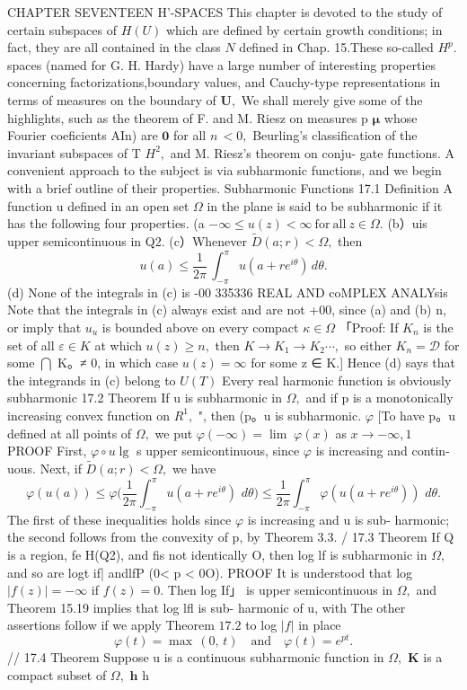 CHAPTER SEVENTEEN H'-SPACES This chapter is devoted to the study of certain subspaces of $H(U)$ which are defined by certain growth conditions; in fact, they are all contained in the class ${\mathbf{}}N$ defined in Chap. 15.These so-called $H^{p}.$ spaces (named for G. H. Hardy) have a large number of interesting properties concerning factorizations,boundary values, and Cauchy-type representations in terms of measures on the boundary of ${\boldsymbol{U}},$ We shall merely give some of the highlights, such as the theorem of F. and M. Riesz on measures p ${\boldsymbol{\mu}}$ whose Fourier coeficients AIn) are $\mathbf{0}$ for all $\scriptstyle n\,<0,$ Beurling's classification of the invariant subspaces of T $H^{2},$ and M. Riesz's theorem on conju- gate functions. A convenient approach to the subject is via subharmonic functions, and we begin with a brief outline of their properties. Subharmonic Functions 17.1 Definition A function u defined in an open set $\Omega$ in the plane is said to be subharmonic if it has the following four properties. (a $-\infty\leq u(z)<\infty{\mathrm{~for~all~}}z\in\Omega.$ (b）uis upper semicontinuous in Q2. (c）Whenever ${\tilde{D}}(a;r)<\Omega,$ then $$ u(a)\leq{\frac{1}{2\pi}}\,\int_{-\pi}^{\pi}u(a+r e^{i\theta})\,d\theta. $$ (d) None of the integrals in (c) is -00 335336 REAL AND coMPLEX ANALYsis Note that the integrals in (c) always exist and are not +00, since (a) and (b) n, or imply that $u_{u}$ is bounded above on every compact $\kappa\in\Omega$ 「Proof: If $K_{n}$ is the set of all $\scriptstyle{\varepsilon\in K}$ at which $u(z)\geq n,$ then $K\to K_{1}\to K_{2}\cdots,$ so either $K_{n}={\mathcal{D}}$ for some $\bigcap{}$ K。≠ 0, in which case $u(z)=\infty$ for some z ∈ K.] Hence (d) says that the integrands in (c) belong to $\scriptstyle U(T)$ Every real harmonic function is obviously subharmonic 17.2 Theorem If u is subharmonic in $\Omega,$ and if p is a monotonically increasing convex function on $R^{1},$ ", then (p。u is subharmonic. $\varphi$ [To have p。u defined at all points of $\Omega,$ we put $\varphi(-\infty)=\operatorname*{lim}\;\varphi(x)$ as $x\to-\infty,1$ PROOF First, $\varphi\circ u\lg$ s upper semicontinuous, since $\varphi$ is increasing and contin- uous. Next, if ${\tilde{D}}(a;r)<\Omega,$ we have $$ \varphi(u(a))\leq\varphi{\Biggl(}{\frac{1}{2\pi}}\int_{-\pi}^{\pi}u(a+r e^{i\theta})\,\,d\theta{\Biggr)}\leq{\frac{1}{2\pi}}\int_{-\pi}^{\pi}\varphi(u(a+r e^{i\theta}))\,\,d\theta. $$ The first of these inequalities holds since $\varphi$ is increasing and u is sub- harmonic; the second follows from the convexity of p, by Theorem 3.3. / 17.3 Theorem If Q is a region, fe H(Q2), and fis not identically O, then log lf is subharmonic in $\Omega,$ and so are logt if| andlfP (0< p < 0O). PROOF It is understood that log $|f(z)|=-\infty$ if $f(z)=0.$ Then log If」 is upper semicontinuous in $\Omega,$ and Theorem 15.19 implies that log lfl is sub- harmonic of u, with The other assertions follow if we apply Theorem $17.2$ to log $|f|$ in place $$ \varphi(t)=\operatorname*{max}\,(0,\,t)\quad{\mathrm{and}}\quad\varphi(t)=e^{p t}. $$ // 17.4 Theorem Suppose u is a continuous subharmonic function in $\Omega,$ ${\boldsymbol{K}}$ is a compact subset of $\Omega,$ ${\boldsymbol{h}}$ h 